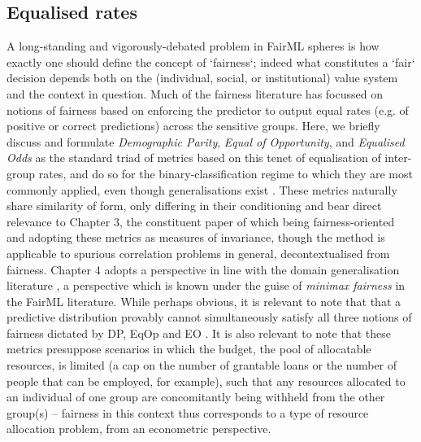 \subsection{Equalised rates}\label{sec:equalised-rates}
%
A long-standing and vigorously-debated problem in FairML spheres is how exactly one should define
the concept of `fairness`; indeed what constitutes a `fair` decision depends both on the
(individual, social, or institutional) value system and the context in question.
%
Much of the fairness literature has focussed on notions of fairness based on enforcing the
predictor to output equal rates (e.g. of positive or correct predictions) across the sensitive
groups.
%
Here, we briefly discuss and formulate \emph{Demographic Parity}, \emph{Equal of Opportunity}, and
\emph{Equalised Odds} as the standard triad of metrics based on this tenet of equalisation of
inter-group rates, and do so for the binary-classification regime to which they are most commonly
applied, even though generalisations exist \citep{woodworth2017learning}. 
%
These metrics naturally share similarity of form, only differing in their conditioning and bear
direct relevance to Chapter 3, the constituent paper of which being fairness-oriented and adopting
these metrics as measures of invariance, though the method is applicable to spurious correlation
problems in general, decontextualised from fairness.
%
Chapter 4 adopts a perspective in line with the domain generalisation literature
\cite{sagawa2019distributionally}, a perspective which is known under the guise of \emph{minimax
fairness} in the FairML literature.
%
While perhaps obvious, it is relevant to note that that a predictive distribution provably cannot
simultaneously satisfy all three notions of fairness dictated by DP, EqOp and EO
\citep{kleinberg2016inherent}.
%
It is also relevant to note that these metrics presuppose scenarios in which the budget, the pool
of allocatable resources, is limited (a cap on the number of grantable loans or the number of
people that can be employed, for example), such that any resources allocated to an individual of
one group are concomitantly being withheld from the other group(s) -- fairness in this context thus
corresponds to a type of resource allocation problem, from an econometric perspective.
%

